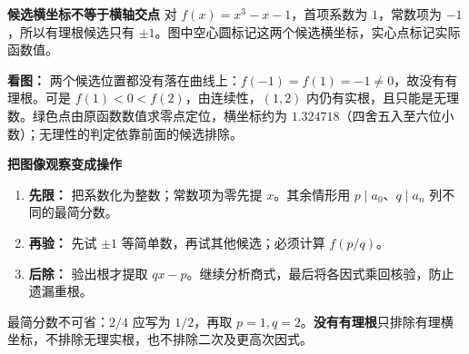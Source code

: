\begin{explanationbox}
\textbf{\textcolor{CExplanation}{候选横坐标不等于横轴交点}}
对 $f(x)=x^3-x-1$，首项系数为 $1$，常数项为 $-1$，所以有理根候选只有 $\pm1$。图中空心圆标记这两个候选横坐标，实心点标记实际函数值。

\textbf{看图：} 两个候选位置都没有落在曲线上：$f(-1)=f(1)=-1\ne0$，故没有有理根。可是 $f(1)<0<f(2)$，由连续性，$(1,2)$ 内仍有实根，且只能是无理数。绿色点由原函数数值求零点定位，横坐标约为 $1.324718$（四舍五入至六位小数）；无理性的判定依靠前面的候选排除。

\medskip
\textbf{\textcolor{CExplanation}{把图像观察变成操作}}
\begin{enumerate}[leftmargin=*,itemsep=0.5em]
\item \textbf{先限：} 把系数化为整数；常数项为零先提 $x$。其余情形用 $p\mid a_0$、$q\mid a_n$ 列不同的最简分数。
\item \textbf{再验：} 先试 $\pm1$ 等简单数，再试其他候选；必须计算 $f(p/q)$。
\item \textbf{后除：} 验出根才提取 $qx-p$。继续分析商式，最后将各因式乘回核验，防止遗漏重根。
\end{enumerate}
最简分数不可省：$2/4$ 应写为 $1/2$，再取 $p=1,q=2$。\textbf{没有有理根}只排除有理横坐标，不排除无理实根，也不排除二次及更高次因式。
\end{explanationbox}
\clearpage

